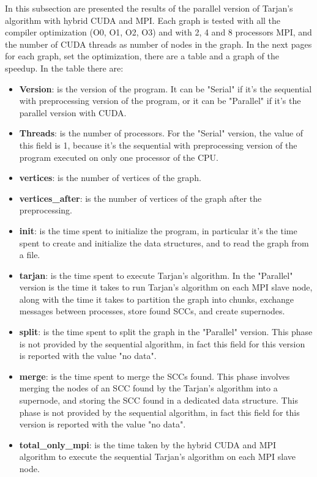 In this subsection are presented the results of the parallel version of Tarjan's algorithm with hybrid CUDA and MPI.
Each graph is tested with all the compiler optimization (O0, O1, O2, O3) and with 2, 4 and 8 processors MPI, and the number of CUDA threads as number of nodes in the graph.
In the next pages for each graph, set the optimization, there are a table and a graph of the speedup.
In the table there are:
\begin{itemize}
    \item \textbf{Version}: is the version of the program. It can be "Serial" if it's the sequential with preprocessing version of the program, or it can be "Parallel" if it's the parallel version with CUDA.
    \item \textbf{Threads}: is the number of processors. For the "Serial" version, the value of this field is 1, because it's the sequential with preprocessing version of the program executed on only one processor of the CPU.
    \item \textbf{vertices}: is the number of vertices of the graph.
    \item \textbf{vertices\_after}: is the number of vertices of the graph after the preprocessing.
    \item \textbf{init}: is the time spent to initialize the program, in particular it's the time spent to create and initialize the data structures, and to read the graph from a file.
    \item \textbf{tarjan}: is the time spent to execute Tarjan's algorithm. In the "Parallel" version is the time it takes to run Tarjan's algorithm on each MPI slave node, along with the time it takes to partition the graph into chunks, exchange messages between processes, store found SCCs, and create supernodes.
    \item \textbf{split}: is the time spent to split the graph in the "Parallel" version. This phase is not provided by the sequential algorithm, in fact this field for this version is reported with the value "no data".
    \item \textbf{merge}: is the time spent to merge the SCCs found. This phase involves merging the nodes of an SCC found by the Tarjan's algorithm into a supernode, and storing the SCC found in a dedicated data structure.
    This phase is not provided by the sequential algorithm, in fact this field for this version is reported with the value "no data".
    \item \textbf{total\_only\_mpi}: is the time taken by the hybrid CUDA and MPI algorithm to execute the sequential Tarjan's algorithm on each MPI slave node.  

\end{itemize}
